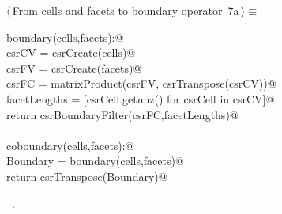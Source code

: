 \documentclass[11pt,oneside]{article}	%
\begin{document}
\begin{flushleft} \small
\begin{minipage}{\linewidth} \label{scrap17}
\protect{}$\langle\,$From cells and facets to boundary operator\nobreak\ {\footnotesize 7a}$\,\rangle\equiv$
\vspace{-1ex}
\begin{list}{}{} \item
\mbox{}\verb@def boundary(cells,facets):@\\
\mbox{}\verb@    csrCV = csrCreate(cells)@\\
\mbox{}\verb@    csrFV = csrCreate(facets)@\\
\mbox{}\verb@    csrFC = matrixProduct(csrFV, csrTranspose(csrCV))@\\
\mbox{}\verb@    facetLengths = [csrCell.getnnz() for csrCell in csrCV]@\\
\mbox{}\verb@    return csrBoundaryFilter(csrFC,facetLengths)@\\
\mbox{}\verb@@\\
\mbox{}\verb@def coboundary(cells,facets):@\\
\mbox{}\verb@    Boundary = boundary(cells,facets)@\\
\mbox{}\verb@    return csrTranspose(Boundary)@\\
\mbox{}\verb@@{\NWsep}
\end{list}
\vspace{-1ex}
\footnotesize\addtolength{\baselineskip}{-1ex}
\begin{list}{}{\setlength{\itemsep}{-\parsep}\setlength{\itemindent}{-\leftmargin}}
\item \NWtxtMacroRefIn\ .
\end{list}
\end{minipage}\\[4ex]
\end{flushleft}
\end{document}
